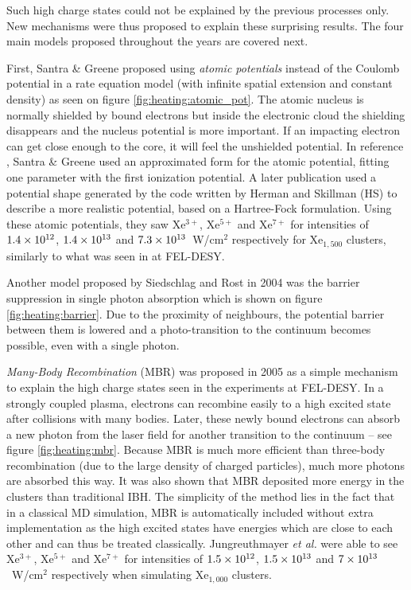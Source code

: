 Such high charge states could not be explained by the previous processes only.
New mechanisms were thus proposed to explain these surprising results.
The four main models proposed throughout the years are covered next.



First, Santra \& Greene proposed using \textit{atomic potentials} instead of
the Coulomb potential in a rate equation model (with infinite spatial
extension and
constant density) as seen on figure \ref{fig:heating:atomic_pot}.
The atomic nucleus is normally shielded by bound electrons but inside the
electronic cloud the shielding disappears and the nucleus potential is more
important. If an impacting electron can get close enough to the core, it will
feel the unshielded potential.
In reference \cite{Greene2003}, Santra \& Greene used an approximated form for
the atomic potential, fitting one parameter with the first ionization potential.
A later\cite{Walters2006} publication used a
potential shape generated by the code written by Herman and
Skillman\cite{HS1963} (HS) to describe a more realistic
potential, based on a
Hartree-Fock formulation. Using these atomic potentials, they saw Xe$^{3+}$,
Xe$^{5+}$ and Xe$^{7+}$ for intensities of $\ten{1.4}{12}$, $\ten{1.4}{13}$ and
$\ten{7.3}{13}$~W/cm$^2$ respectively for Xe$_{1,500}$ clusters, similarly to
what was seen in at FEL-DESY.

\newpage
{}

Another model proposed by Siedschlag and Rost\cite{Siedschlag2004} in 2004 was
the barrier suppression in single photon absorption which is shown on figure
\ref{fig:heating:barrier}. Due to the proximity
of neighbours, the potential barrier between them is lowered and
a photo-transition to the continuum becomes possible, even with a single photon.



\textit{Many-Body Recombination} (MBR) was proposed in 2005\cite{Jungreuthmayer2005}
as a simple mechanism to explain the high charge states seen in the
experiments at FEL-DESY. In a strongly coupled plasma, electrons can recombine
easily to a high excited
state after collisions with many bodies. Later, these newly bound electrons can
absorb a new photon from the laser field for another transition to the
continuum -- see figure \ref{fig:heating:mbr}.
Because MBR is much more efficient than three-body
recombination (due to the large density of charged particles), much more
photons are absorbed this way. It was also shown that MBR deposited more energy
in the clusters than traditional IBH.
The simplicity of the
method lies in the fact that in a classical MD simulation, MBR is automatically
included without extra implementation as the high excited states have energies
which are close to each other and can thus be treated classically.
Jungreuthmayer \textit{et al.} were able
to see Xe$^{3+}$, Xe$^{5+}$ and Xe$^{7+}$ for intensities of $\ten{1.5}{12}$,
$\ten{1.5}{13}$ and $\ten{7}{13}$~W/cm$^2$ respectively when simulating
Xe$_{1,000}$ clusters.

